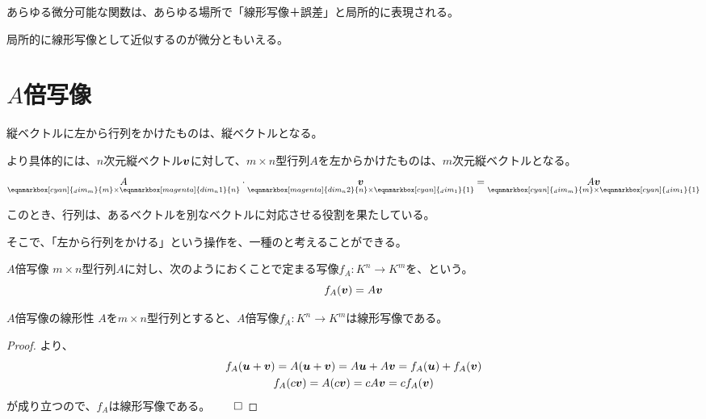 \documentclass[../../../topic_linear-algebra]{subfiles}
\begin{document}
あらゆる微分可能な関数は、あらゆる場所で「線形写像＋誤差」と局所的に表現される。

局所的に線形写像として近似するのが微分ともいえる。

\sectionline
\section{$A$倍写像}

縦ベクトルに左から行列をかけたものは、縦ベクトルとなる。

より具体的には、$n$次元縦ベクトル$\vb*{v}$に対して、$m \times n$型行列$A$を左からかけたものは、$m$次元縦ベクトルとなる。
\begin{equation*}
  \underset{\eqnmarkbox[cyan]{_dim_m}{m} \times \eqnmarkbox[magenta]{dim_n1}{n}}{A} \cdot \underset{\eqnmarkbox[magenta]{dim_n2}{n} \times \eqnmarkbox[cyan]{_dim_1}{1}}{\vb*{v}} = \underset{\eqnmarkbox[cyan]{_dim_m}{m} \times \eqnmarkbox[cyan]{_dim_1}{1}}{A \vb*{v}}
\end{equation*}

このとき、行列は、あるベクトルを別なベクトルに対応させる役割を果たしている。

そこで、「左から行列をかける」という操作を、一種のと考えることができる。

\begin{definition*}{$A$倍写像}
  $m \times n$型行列$A$に対し、次のようにおくことで定まる写像$f_A \colon K^n \to K^m$を、という。
  \begin{equation*}
    f_A (\vb*{v}) = A \vb*{v}
  \end{equation*}
\end{definition*}

\begin{theorem*}{$A$倍写像の線形性}
  $A$を$m \times n$型行列とすると、$A$倍写像$f_A\colon K^n \to K^m$は線形写像である。
\end{theorem*}

\begin{proof}
  より、
  \begin{gather*}
    f_A(\vb*{u} + \vb*{v}) = A(\vb*{u} + \vb*{v}) = A\vb*{u} + A\vb*{v} = f_A(\vb*{u}) + f_A(\vb*{v}) \\
    f_A(c\vb*{v}) = A(c\vb*{v}) = cA\vb*{v} = cf_A(\vb*{v})
  \end{gather*}
  が成り立つので、$f_A$は線形写像である。$\qed$
\end{proof}
\end{document}
